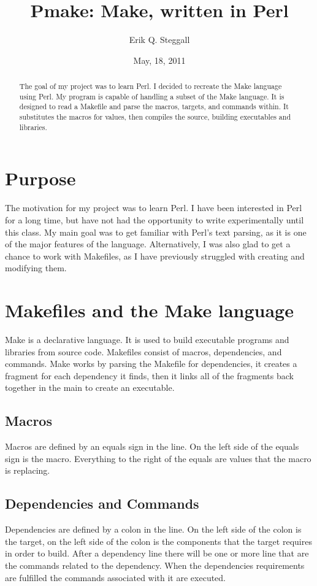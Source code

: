 \documentclass[a4paper, 12pt]{article}
\title{Pmake: Make, written in Perl}
\date{May, 18, 2011}
\author{Erik Q. Steggall}
\begin{document}
\maketitle

\begin{abstract}
The goal of my project was to learn Perl. I decided to recreate the Make language using Perl. My program is capable of handling a subset of the Make language. It is designed to read a Makefile and parse the macros, targets, and commands within. It substitutes the macros for values, then compiles the source, building executables and libraries.\\
\end{abstract}

\section{Purpose}
The motivation for my project was to learn Perl. I have been interested in Perl for a long time, but have not had the opportunity to write experimentally until this class. My main goal was to get familiar with Perl's text parsing, as it is one of the major features of the language. Alternatively, I was also glad to get a chance to work with Makefiles, as I have previously struggled with creating and modifying them.\\

\section{Makefiles and the Make language}
Make is a declarative language. It is used to build executable programs and libraries from source code. Makefiles consist of macros, dependencies, and commands. Make works by parsing the Makefile for dependencies, it creates a fragment for each dependency it finds, then it links all of the fragments back together in the main to create an executable.\\ 

\subsection{Macros}
Macros are defined by an equals sign in the line. On the left side of the equals sign is the macro. Everything to the right of the equals are values that the macro is replacing.\\ 
\subsection{Dependencies and Commands}
	Dependencies are defined by a colon in the line. On the left side of the colon is the target, on the left side of the colon is the components that the target requires in order to build. After a dependency line there will be one or more line that are the commands related to the dependency. When the dependencies requirements are fulfilled the commands associated with it are executed.\\
\end{document}
